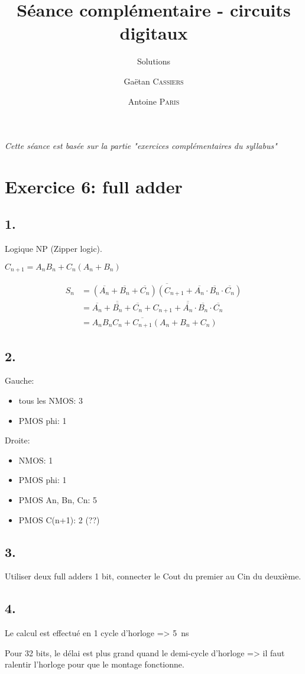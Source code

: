 \documentclass[frenchb,DIV=14]{scrartcl}
\title{Séance complémentaire - circuits digitaux}
\subtitle{Solutions}
\author{\small Gaëtan \textsc{Cassiers} \and\small Antoine \textsc{Paris}}
\date{}
\begin{document}
\maketitle

\emph{Cette séance est basée sur la partie "exercices complémentaires du syllabus"}

\section*{Exercice 6: full adder}

\subsection*{1.}

Logique NP (Zipper logic).

$C_{n+1} = A_n B_n + C_n (A_n + B_n)$

\begin{align*}
    S_n &= \overline{(\overline{A_n} + \overline{B_n} + \overline{C_n})(C_{n+1} + \overline{A_n}\cdot\overline{B_n}\cdot\overline{C_n})} \\
    &=  \overline{\overline{A_n}+\overline{B_n}+\overline{C_n}} + \overline{C_{n+1} + \overline{A_n}\cdot\overline{B_n}\cdot\overline{C_n}} \\
    &= A_n B_n C_n + \overline{C_{n+1}}(A_n+B_n+C_n)
\end{align*}

\subsection*{2. }

Gauche:
\begin{itemize}
    \item tous les NMOS: 3
    \item PMOS phi: 1
\end{itemize}

Droite:
\begin{itemize}
    \item NMOS: 1
    \item PMOS phi: 1
    \item PMOS An, Bn, Cn: 5
    \item PMOS C(n+1): 2 (??)
\end{itemize}

\subsection*{3.}

Utiliser deux full adders 1 bit, connecter le Cout du premier au Cin du deuxième. 

\subsection*{4.}

Le calcul est effectué en 1 cycle d'horloge => \SI{5}{ns}

Pour 32 bits, le délai est plus grand quand le demi-cycle d'horloge => il faut ralentir l'horloge pour que le montage fonctionne.
\end{document}

